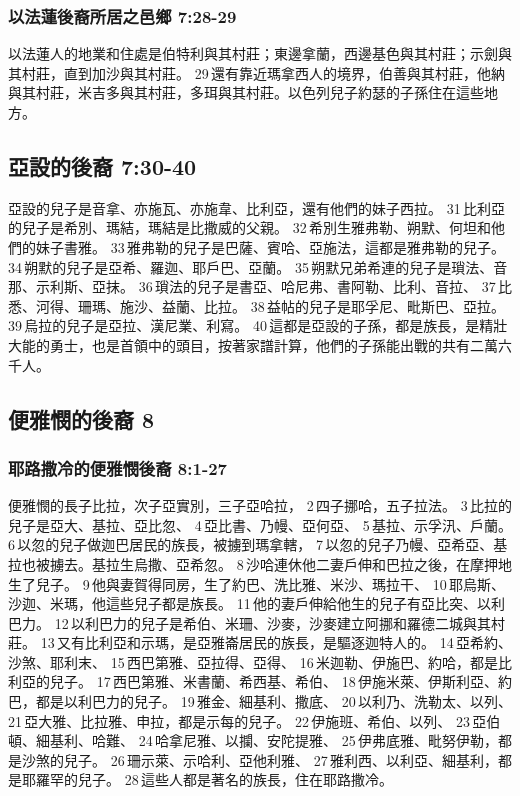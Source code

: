 \subsubsection{以法蓮後裔所居之邑鄉 7:28-29}
以法蓮人的地業和住處是伯特利與其村莊；東邊拿蘭，西邊基色與其村莊；示劍與其村莊，直到加沙與其村莊。 29 還有靠近瑪拿西人的境界，伯善與其村莊，他納與其村莊，米吉多與其村莊，多珥與其村莊。以色列兒子約瑟的子孫住在這些地方。

\subsection{亞設的後裔 7:30-40 }
亞設的兒子是音拿、亦施瓦、亦施韋、比利亞，還有他們的妹子西拉。 31 比利亞的兒子是希別、瑪結，瑪結是比撒威的父親。 32 希別生雅弗勒、朔默、何坦和他們的妹子書雅。 33 雅弗勒的兒子是巴薩、賓哈、亞施法，這都是雅弗勒的兒子。 34 朔默的兒子是亞希、羅迦、耶戶巴、亞蘭。 35 朔默兄弟希連的兒子是瑣法、音那、示利斯、亞抹。 36 瑣法的兒子是書亞、哈尼弗、書阿勒、比利、音拉、 37 比悉、河得、珊瑪、施沙、益蘭、比拉。 38 益帖的兒子是耶孚尼、毗斯巴、亞拉。 39 烏拉的兒子是亞拉、漢尼業、利寫。 40 這都是亞設的子孫，都是族長，是精壯大能的勇士，也是首領中的頭目，按著家譜計算，他們的子孫能出戰的共有二萬六千人。

\subsection{便雅憫的後裔 8 }
\subsubsection{耶路撒冷的便雅憫後裔 8:1-27}
便雅憫的長子比拉，次子亞實別，三子亞哈拉， 2 四子挪哈，五子拉法。 3 比拉的兒子是亞大、基拉、亞比忽、 4 亞比書、乃幔、亞何亞、 5 基拉、示孚汛、戶蘭。 6 以忽的兒子做迦巴居民的族長，被擄到瑪拿轄， 7 以忽的兒子乃幔、亞希亞、基拉也被擄去。基拉生烏撒、亞希忽。 8 沙哈連休他二妻戶伸和巴拉之後，在摩押地生了兒子。 9 他與妻賀得同房，生了約巴、洗比雅、米沙、瑪拉干、 10 耶烏斯、沙迦、米瑪，他這些兒子都是族長。 11 他的妻戶伸給他生的兒子有亞比突、以利巴力。 12 以利巴力的兒子是希伯、米珊、沙麥，沙麥建立阿挪和羅德二城與其村莊。 13 又有比利亞和示瑪，是亞雅崙居民的族長，是驅逐迦特人的。 14 亞希約、沙煞、耶利末、 15 西巴第雅、亞拉得、亞得、 16 米迦勒、伊施巴、約哈，都是比利亞的兒子。 17 西巴第雅、米書蘭、希西基、希伯、 18 伊施米萊、伊斯利亞、約巴，都是以利巴力的兒子。 19 雅金、細基利、撒底、 20 以利乃、洗勒太、以列、 21 亞大雅、比拉雅、申拉，都是示每的兒子。 22 伊施班、希伯、以列、 23 亞伯頓、細基利、哈難、 24 哈拿尼雅、以攔、安陀提雅、 25 伊弗底雅、毗努伊勒，都是沙煞的兒子。 26 珊示萊、示哈利、亞他利雅、 27 雅利西、以利亞、細基利，都是耶羅罕的兒子。 28 這些人都是著名的族長，住在耶路撒冷。

